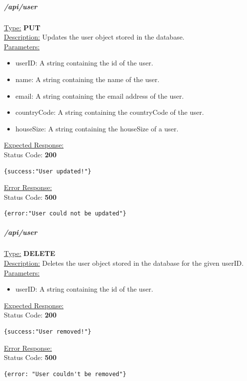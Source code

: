 \documentclass[draft,preprint,12pt,3p]{elsarticle}
\newcommand{\forceindent}{\leavevmode{\parindent=1em\indent}}
\begin{document}
\subparagraph*{/api/user}
\underline{Type:} \textbf{PUT}\\

\underline{Description:} Updates the user object stored in the database.\\

\underline{Parameters:}
\begin{itemize}
\item userID: A string containing the id of the user.

\item name: A string containing the name of the user.

\item email: A string containing the email address of the user.

\item countryCode: A string containing the countryCode of the user.

\item houseSize: A string containing the houseSize of a user.
\end{itemize}
\underline{Expected Response:}\\[5pt]
\forceindent Status Code: \textbf{200} \\
\begin{verbatim}
{success:"User updated!"}
\end{verbatim}
\underline{Error Response:}\\[5pt]
\forceindent Status Code: \textbf{500} \\
\begin{verbatim}
{error:"User could not be updated"}
\end{verbatim}

\subparagraph*{/api/user}
\underline{Type:} \textbf{DELETE}\\

\underline{Description:} Deletes the user object stored in the database for the given userID.\\

\underline{Parameters:}
\begin{itemize}
\item userID: A string containing the id of the user.
\end{itemize}

\underline{Expected Response:}\\[5pt]
\forceindent Status Code: \textbf{200} \\
\begin{verbatim}
{success:"User removed!"}
\end{verbatim}
\underline{Error Response:}\\[5pt]
\forceindent Status Code: \textbf{500} \\
\begin{verbatim}
{error: "User couldn't be removed"}
\end{verbatim}
\end{document}
